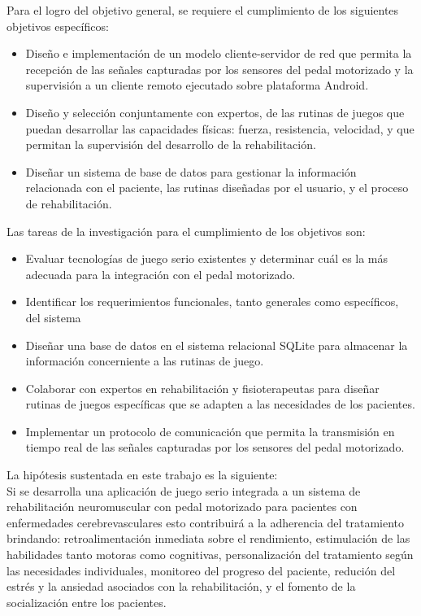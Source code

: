 \begin{introduction}
    \vspace{5pt}
    Para el logro del objetivo general, se requiere el cumplimiento de los siguientes objetivos específicos:
    \begin{itemize}
        \item Diseño e implementación de un modelo cliente-servidor de red que permita la
        recepción de las señales capturadas por los sensores del pedal motorizado
        y la supervisión a un cliente remoto ejecutado sobre plataforma Android.
        \item  Diseño y selección conjuntamente con expertos, de las rutinas de juegos que
        puedan desarrollar las capacidades físicas: fuerza, resistencia, velocidad, y que
        permitan la supervisión del desarrollo de la rehabilitación.
        \item Diseñar un sistema de base de datos para gestionar la información relacionada con
        el paciente, las rutinas diseñadas por el usuario, y el proceso de
        rehabilitación.
    \end{itemize}
    Las tareas de la investigación para el cumplimiento de los objetivos son:
    \begin{itemize}
        \item Evaluar tecnologías de juego serio existentes y determinar cuál es la más adecuada para la integración con el pedal motorizado.
        \item Identificar los requerimientos funcionales, tanto generales como específicos, del sistema
        \item Diseñar una base de datos en el sistema relacional SQLite para almacenar la información concerniente a las rutinas de juego. 
        \item Colaborar con expertos en rehabilitación y fisioterapeutas para diseñar rutinas de juegos específicas que se adapten a las necesidades de los pacientes.
        \item Implementar un protocolo de comunicación que permita la transmisión en tiempo real de las señales capturadas por los sensores del pedal motorizado. 
    \end{itemize}

    La hipótesis sustentada en este trabajo es la siguiente:\\
    Si se desarrolla una aplicación de juego serio integrada a un sistema de rehabilitación neuromuscular con pedal motorizado para pacientes con
    enfermedades cerebrevasculares esto contribuirá a la adherencia del tratamiento brindando: retroalimentación inmediata sobre el rendimiento, estimulación de las 
    habilidades tanto motoras como cognitivas, personalización del tratamiento según las necesidades individuales, monitoreo del progreso del paciente, redución 
    del estrés y la ansiedad asociados con la rehabilitación, y el fomento de la socialización entre los pacientes.


\end{introduction}
